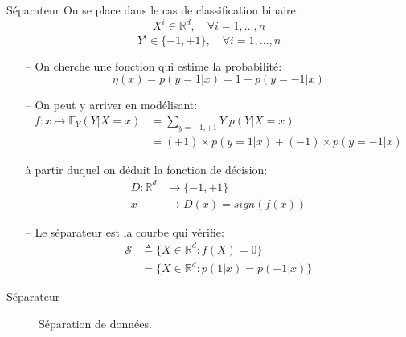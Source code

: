 \documentclass[9pt]{beamer}
\begin{document}
	\begin{frame}{Séparateur}
		On se place dans le cas de classification binaire:
		$$ X^i \in \mathbb{R}^d , \quad \forall i=1,\dots,n$$
		$$ Y^i \in \{-1, +1\} , \quad \forall i=1,\dots,n$$
		\begin{itemize}
			\item[--]On cherche une fonction qui estime la probabilité:
			$$ \eta(x) = p(y = 1 \vert x) = 1 - p(y = -1 \vert x)$$
			\item[--] On peut y arriver en modélisant:
			\begin{align*}
				f: x \mapsto \mathbb{E}_Y(Y \vert X=x) &= \sum_{y=-1, +1} Y.p(Y\vert X=x)\\
				&= (+1) \times p(y = 1\vert x) + (-1) \times p(y = -1\vert x)
			\end{align*}

			à partir duquel on déduit la fonction de décision:
			\begin{align*}
				D: \mathbb{R}^d &\rightarrow \{-1, +1\} \\
				x &\mapsto D(x) = sign(f(x))
			\end{align*}
			\item[--] Le séparateur est la courbe qui vérifie:
			\begin{align*}
				\mathscr{S} &\triangleq \{X \in \mathbb{R}^d: f(X) = 0\} \\
							&= \{X \in \mathbb{R}^d: p(1\vert x) = p(-1\vert x)\}
			\end{align*}
		\end{itemize}
	\end{frame}

	\begin{frame}{Séparateur}
		\begin{figure}[H]
			{
				\caption{\label{fig::separators} Séparation de données.}
			}
		\end{figure}
	\end{frame}
\end{document}
